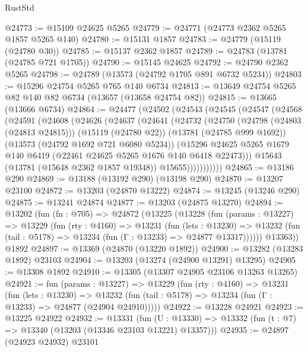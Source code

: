 \begin{lexlean}{RustStd}
\begin{coremodule}
@24773 := @15109 @24625 @5265
@24779 := @24771 (@24773 @2362 @5265 @1857 @5265 @140)
@24780 := @15131 @1857
@24783 := @24779 (@15119 (@24780 @30))
@24785 := @15137 @2362 @1857
@24789 := @24783 (@13781 (@24785 @721 @1705))
@24790 := @15145 @24625
@24792 := @24790 @2362 @5265
@24798 := @24789 (@13573 (@24792 @1705 @891 @6732 @5234))
@24803 := @15296 @24754 @5265 @765 @140 @6734
@24813 := @13649 @24754 @5265 @82 @140 @82 @6734 (@13657 (@13658 @24754 @82))
@24815 := @13665 (@13666 @6734)
@24864 := @24477
    (@24502
      (@24543
        (@24545
          (@24547
            (@24568
              (@24591
                (@24608
                  (@24626
                    (@24637
                      (@24641
                        (@24732
                          (@24750
                            (@24798 (@24803 (@24813 @24815)))
                            (@15119 (@24780 @22))
                            (@13781 (@24785 @999 @1692))
                            (@13573 (@24792 @1692 @721 @6080 @5234))
                            (@15296
                              @24625
                              @5265
                              @1679
                              @140
                              @6419
                              (@22461 @24625 @5265 @1676 @140 @6418 @22473)))
                          @15643
                          (@13781 (@15648 @2362 @1857 @19348))
                          @15655)))))))))))
@24865 := @13186 @290
@24869 := @13188 (@13192 @290) (@13198 @290)
@24870 := @13207 @23100
@24872 := @13203 (@24870 @13222)
@24874 := @13245 (@13246 @290)
@24875 := @13241 @24874
@24877 := @13203 (@24875 @13270)
@24894 := @13202
    (fun (fn : @705) =>
    @24872
      (@13225
        (@13228
          (fun (params : @13227) =>
          @13229
            (fun (rty : @4160) =>
            @13231
              (fun (lets : @13230) =>
              @13232 (fun (tail : @5178) => @13234 (fun (Γ : @13233) => @24877 @13317))))))
        @13363))
    @1892
@24897 := @13369 (@24870 (@13220 @1892))
@24900 := @13282 (@13283 @1892) @23103
@24904 := @13203 (@13274 (@24900 @13291) @13295)
@24905 := @13308 @1892
@24910 := @13305 (@13307 @24905 @23106 @13263 @13265)
@24921 := fun (params : @13227) =>
  @13229
    (fun (rty : @4160) =>
    @13231
      (fun (lets : @13230) =>
      @13232 (fun (tail : @5178) => @13234 (fun (Γ : @13233) => @24877 (@24904 @24910)))))
@24922 := @13228 @24921
@24923 := @13225 @24922
@24932 := @13331
    (fun (U : @13330) => @13332 (fun (t : @7) => @13340 (@13203 (@13346 @23103 @13221) @13357)))
@24935 := @24897 (@24923 @24932) @23101

\end{coremodule}
\end{lexlean}
